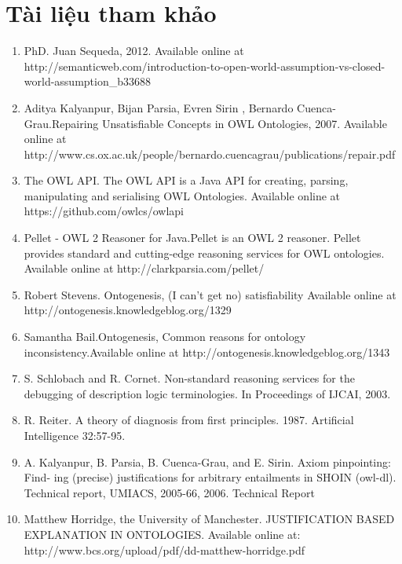 \chapter{Tài liệu tham khảo}
\begin{enumerate}
\item
PhD. Juan Sequeda, 2012. Available online at http://semanticweb.com/introduction-to-open-world-assumption-vs-closed-world-assumption\_b33688
\item 
Aditya Kalyanpur, Bijan Parsia, Evren Sirin
, Bernardo Cuenca-Grau.Repairing Unsatisfiable Concepts in OWL Ontologies, 2007. Available online at \\ http://www.cs.ox.ac.uk/people/bernardo.cuencagrau/publications/repair.pdf
\item
The OWL API. The OWL API is a Java API for creating, parsing, manipulating and serialising OWL Ontologies. Available online at
https://github.com/owlcs/owlapi
\item
Pellet - OWL 2 Reasoner for Java.Pellet is an OWL 2 reasoner. Pellet provides standard and cutting-edge reasoning services for OWL ontologies. Available online at http://clarkparsia.com/pellet/
\item 
Robert Stevens. Ontogenesis, (I can’t get no) satisfiability Available online at http://ontogenesis.knowledgeblog.org/1329
\item
Samantha Bail.Ontogenesis, Common reasons for ontology inconsistency.Available online at http://ontogenesis.knowledgeblog.org/1343
\item 
S. Schlobach and R. Cornet. Non-standard reasoning services for the debugging of description logic terminologies. In Proceedings of IJCAI, 2003.
\item
R. Reiter. A theory of diagnosis from first principles. 1987. Artificial Intelligence
32:57-95.
\item
A. Kalyanpur, B. Parsia, B. Cuenca-Grau, and E. Sirin. Axiom pinpointing: Find-
ing (precise) justifications for arbitrary entailments in SHOIN (owl-dl). Technical
report, UMIACS, 2005-66, 2006. Technical Report
\item
Matthew Horridge, the University of Manchester. JUSTIFICATION BASED EXPLANATION IN ONTOLOGIES. Available online at: http://www.bcs.org/upload/pdf/dd-matthew-horridge.pdf
\end{enumerate}


